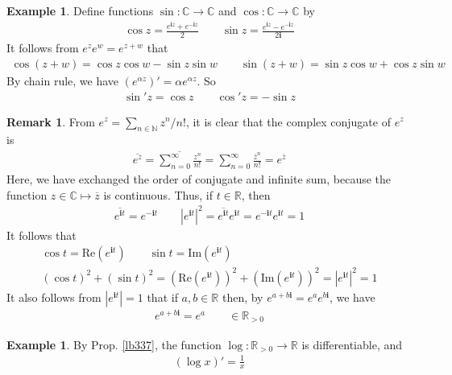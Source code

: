 \documentclass[12pt,b5paper,notitlepage]{article}
\theoremstyle{definition}
\newtheorem{eg}[df]{Example}
\newtheorem{rem}[df]{Remark}
\theoremstyle{plain}
\newcommand{\ovl}{\overline}
\newcommand{\im}{\mathbf{i}}
\newcommand{\Cbb}{\mathbb C}
\newcommand{\Nbb}{\mathbb N}
\newcommand{\Rbb}{\mathbb R}
\newcommand{\Real}{\mathrm{Re}}
\newcommand{\Imag}{\mathrm{Im}}
\numberwithin{equation}{section}
\begin{document}
\begin{eg}
Define functions $\sin:\Cbb\rightarrow\Cbb$ and $\cos:\Cbb\rightarrow\Cbb$  by
\begin{gather*}
\cos z=\frac {e^{\im z}+e^{-\im z}}2\qquad \sin z=\frac{e^{\im z}-e^{-\im z}}{2\im}
\end{gather*}
It follows from $e^ze^w=e^{z+w}$ that
\begin{align}
\cos(z+w)=\cos z\cos w-\sin z\sin w\qquad \sin(z+w)=\sin z\cos w+\cos z\sin w  \label{eq138}
\end{align}
By chain rule, we have $(e^{\alpha z})'=\alpha e^{\alpha z}$. So
\begin{gather*}
\sin'z=\cos z\qquad \cos' z=-\sin z
\end{gather*}
\end{eg}



\begin{rem}
From $e^z=\sum_{n\in\Nbb}z^n/n!$, it is clear that the complex conjugate of $e^z$ is 
\begin{align*}
\ovl{e^z}=\ovl{\sum_{n=0}^\infty\frac {z^n}{n!}}=\sum_{n=0}^\infty\frac {\ovl z^n}{n!}=e^{\ovl z}
\end{align*}
Here, we have exchanged the order of conjugate and infinite sum, because the function $z\in\Cbb\mapsto \ovl z$ is continuous. Thus, if $t\in\Rbb$, then
\begin{align*}
\ovl{e^{\im t}}=e^{-\im t}\qquad |e^{\im t}|^2=\ovl{e^{\im t}} e^{\im t}=e^{-\im t}e^{\im t}=1
\end{align*}
It follows that
\begin{gather*}
\cos t=\Real(e^{\im t})\qquad\sin t=\Imag(e^{\im t})\\
(\cos t)^2+(\sin t)^2=(\Real(e^{\im t}))^2+(\Imag(e^{\im t}))^2=|e^{\im t}|^2=1
\end{gather*}
It also follows from $|e^{\im t}|=1$ that if $a,b\in\Rbb$ then, by $e^{a+b\im}=e^ae^{b\im}$, we have
\begin{align*}
e^{a+b\im}=e^a\qquad\in\Rbb_{>0}
\end{align*}
\end{rem}





\begin{eg}
By Prop. \ref{lb337}, the function $\log:\Rbb_{>0}\rightarrow\Rbb$ is differentiable, and
\begin{align*}
(\log x)'=\frac 1x
\end{align*}
\end{eg}
\end{document}
